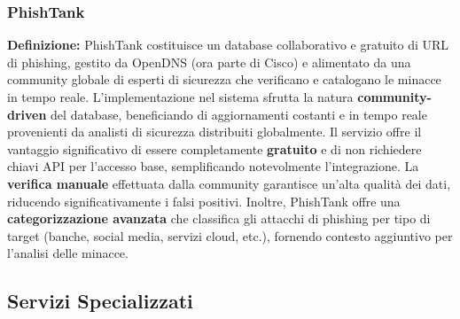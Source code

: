 \documentclass{article}
\begin{document}
\subsubsection{PhishTank}
\textbf{Definizione:} PhishTank costituisce un database collaborativo e gratuito di URL di phishing, gestito da OpenDNS (ora parte di Cisco) e alimentato da una community globale di esperti di sicurezza che verificano e catalogano le minacce in tempo reale.
\newline \newline
L'implementazione nel sistema sfrutta la natura \textbf{community-driven} del database, beneficiando di aggiornamenti costanti e in tempo reale provenienti da analisti di sicurezza distribuiti globalmente. Il servizio offre il vantaggio significativo di essere completamente \textbf{gratuito} e di non richiedere chiavi API per l'accesso base, semplificando notevolmente l'integrazione.
\newline \newline
La \textbf{verifica manuale} effettuata dalla community garantisce un'alta qualità dei dati, riducendo significativamente i falsi positivi. Inoltre, PhishTank offre una \textbf{categorizzazione avanzata} che classifica gli attacchi di phishing per tipo di target (banche, social media, servizi cloud, etc.), fornendo contesto aggiuntivo per l'analisi delle minacce.

\subsection{Servizi Specializzati}
\end{document}
